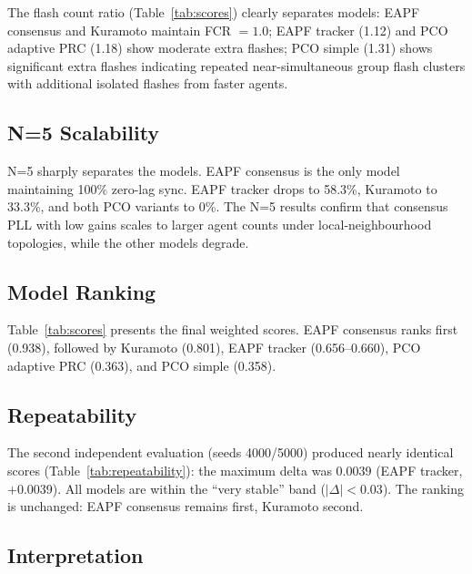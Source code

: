 \documentclass[11pt,a4paper]{article}
\begin{document}
The flash count ratio (Table~\ref{tab:scores}) clearly separates models:
EAPF consensus and Kuramoto maintain FCR $= 1.0$; EAPF tracker (1.12) and
PCO adaptive PRC (1.18) show moderate extra flashes; PCO simple (1.31) shows
significant extra flashes indicating repeated near-simultaneous group flash
clusters with additional isolated flashes from faster agents.

\subsection{N=5 Scalability}

N=5 sharply separates the models.  EAPF consensus is the only model
maintaining 100\% zero-lag sync.  EAPF tracker drops to 58.3\%, Kuramoto to
33.3\%, and both PCO variants to 0\%.  The N=5 results confirm that consensus
PLL with low gains scales to larger agent counts under local-neighbourhood
topologies, while the other models degrade.

\subsection{Model Ranking}

Table~\ref{tab:scores} presents the final weighted scores.  EAPF consensus
ranks first (0.938), followed by Kuramoto (0.801), EAPF tracker (0.656--0.660),
PCO adaptive PRC (0.363), and PCO simple (0.358).

\subsection{Repeatability}

The second independent evaluation (seeds 4000/5000) produced nearly identical
scores (Table~\ref{tab:repeatability}): the maximum delta was 0.0039 (EAPF
tracker, $+$0.0039).  All models are within the ``very stable'' band
($|\Delta| < 0.03$).  The ranking is unchanged: EAPF consensus remains first,
Kuramoto second.

\subsection{Interpretation}
\end{document}
